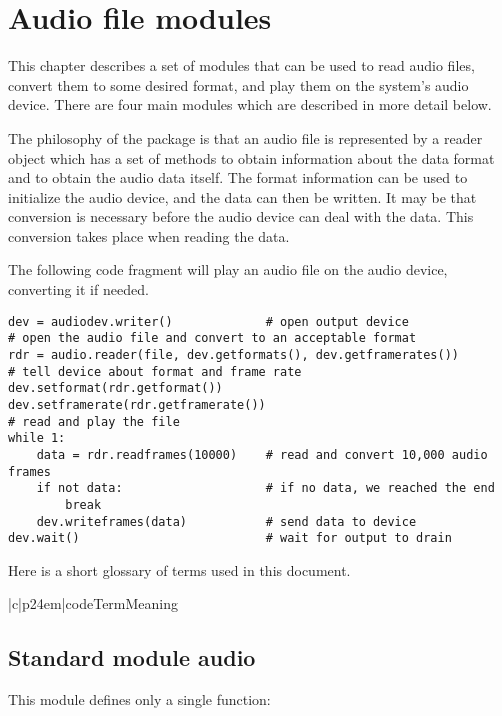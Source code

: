 \chapter{Audio file modules}

This chapter describes a set of modules that can be used to read audio
files, convert them to some desired format, and play them on the
system's audio device.  There are four main modules which are
described in more detail below.

The philosophy of the package is that an audio file is represented by
a reader object which has a set of methods to obtain information about
the data format and to obtain the audio data itself.  The format
information can be used to initialize the audio device, and the data
can then be written.  It may be that conversion is necessary before
the audio device can deal with the data.  This conversion takes place
when reading the data.

The following code fragment will play an audio file on the audio
device, converting it if needed.

\begin{verbatim}
dev = audiodev.writer()             # open output device
# open the audio file and convert to an acceptable format
rdr = audio.reader(file, dev.getformats(), dev.getframerates())
# tell device about format and frame rate
dev.setformat(rdr.getformat())
dev.setframerate(rdr.getframerate())
# read and play the file
while 1:
    data = rdr.readframes(10000)    # read and convert 10,000 audio frames
    if not data:                    # if no data, we reached the end
        break
    dev.writeframes(data)           # send data to device
dev.wait()                          # wait for output to drain
\end{verbatim}

Here is a short glossary of terms used in this document.

\begin{tableii}{|c|p{24em}|}{code}{Term}{Meaning}
\end{tableii}

\section{Standard module audio}
\renewcommand{\indexsubitem}{(in module audio)}

This module defines only a single function:

